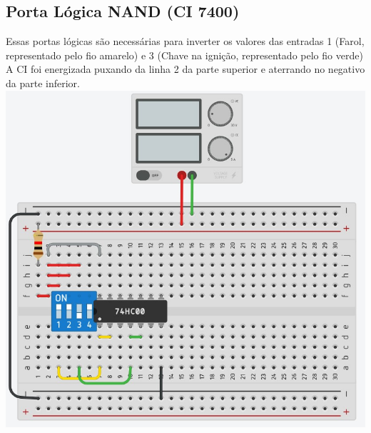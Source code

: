 \documentclass[]{article}
\begin{document}
		\subsection{Porta Lógica NAND (CI 7400)}
			Essas portas lógicas são necessárias para inverter os valores das entradas 1 (Farol, representado pelo fio amarelo) e 3 (Chave na ignição, representado pelo fio verde) \\
			A CI foi energizada puxando da linha 2 da parte superior e aterrando no negativo da parte inferior. \\
			\includegraphics[scale=0.5]{Images/Tinkercad 02.jpg} \\
\end{document}
